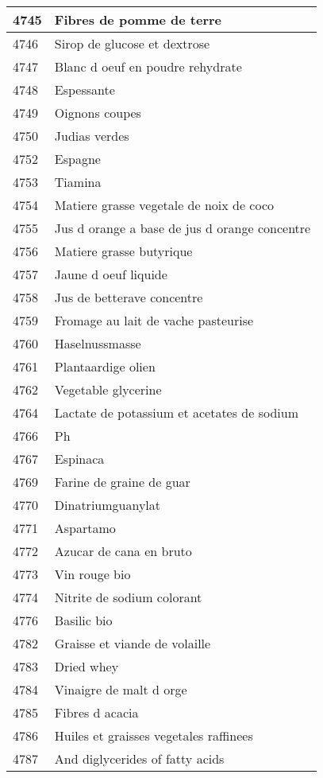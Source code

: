 \begin{longtable}{|l|l|}
4745 & Fibres de pomme de terre \\ \hline 
4746 & Sirop de glucose et dextrose \\ \hline 
4747 & Blanc d oeuf en poudre rehydrate \\ \hline 
4748 & Espessante \\ \hline 
4749 & Oignons coupes \\ \hline 
4750 & Judias verdes \\ \hline 
4752 & Espagne \\ \hline 
4753 & Tiamina \\ \hline 
4754 & Matiere grasse vegetale de noix de coco \\ \hline 
4755 & Jus d orange a base de jus d orange concentre \\ \hline 
4756 & Matiere grasse butyrique \\ \hline 
4757 & Jaune d oeuf liquide \\ \hline 
4758 & Jus de betterave concentre \\ \hline 
4759 & Fromage au lait de vache pasteurise \\ \hline 
4760 & Haselnussmasse \\ \hline 
4761 & Plantaardige olien \\ \hline 
4762 & Vegetable glycerine \\ \hline 
4764 & Lactate de potassium et acetates de sodium \\ \hline 
4766 & Ph \\ \hline 
4767 & Espinaca \\ \hline 
4769 & Farine de graine de guar \\ \hline 
4770 & Dinatriumguanylat \\ \hline 
4771 & Aspartamo \\ \hline 
4772 & Azucar de cana en bruto \\ \hline 
4773 & Vin rouge bio \\ \hline 
4774 & Nitrite de sodium colorant \\ \hline 
4776 & Basilic bio \\ \hline 
4782 & Graisse et viande de volaille \\ \hline 
4783 & Dried whey \\ \hline 
4784 & Vinaigre de malt d orge \\ \hline 
4785 & Fibres d acacia \\ \hline 
4786 & Huiles et graisses vegetales raffinees \\ \hline 
4787 & And diglycerides of fatty acids \\ \hline 

\end{longtable}
